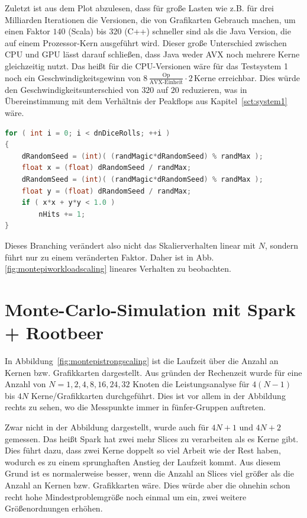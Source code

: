 Zuletzt ist aus dem Plot abzulesen, dass für große Lasten wie z.B. für drei Milliarden Iterationen die Versionen, die von Grafikarten Gebrauch machen, um einen Faktor $140$ (Scala) bis $320$ (C++) schneller sind als die Java Version, die auf einem Prozessor-Kern ausgeführt wird. Dieser große Unterschied zwischen CPU und GPU lässt darauf schließen, dass Java weder AVX noch mehrere Kerne gleichzeitig nutzt. Das heißt für die CPU-Versionen wäre für das Testsystem 1 noch ein Geschwindigkeitsgewinn von $8\,\frac{ \text{Op} }{ \text{AVX-Einheit} } \cdot 2\,\text{Kerne}$ erreichbar. Dies würde den Geschwindigkeitsunterschied von $320$ auf $20$ reduzieren, was in Übereinstimmung mit dem Verhältnis der Peakflops aus Kapitel~\ref{sct:system1} wäre.

\begin{lstlisting}[language=Java,caption={Hauptschleife der Monte-Carlo Pi-Berechnung},label=lst:montemainloop]
for ( int i = 0; i < dnDiceRolls; ++i )
{
    dRandomSeed = (int)( (randMagic*dRandomSeed) % randMax );
    float x = (float) dRandomSeed / randMax;
    dRandomSeed = (int)( (randMagic*dRandomSeed) % randMax );
    float y = (float) dRandomSeed / randMax;
    if ( x*x + y*y < 1.0 )
        nHits += 1;
}
\end{lstlisting}
Dieses Branching verändert also nicht das Skalierverhalten linear mit $N$, sondern führt nur zu einem veränderten Faktor. Daher ist in Abb.\ref{fig:montepiworkloadscaling} lineares Verhalten zu beobachten.



\section{Monte-Carlo-Simulation mit Spark + Rootbeer}


In Abbildung~\ref{fig:montepistrongscaling} ist die Laufzeit über die Anzahl an Kernen bzw. Grafikkarten dargestellt. Aus gründen der Rechenzeit wurde für eine Anzahl von $N=1,2,4,8,16,24,32$ Knoten die Leistungsanalyse für $4(N-1)$ bis $4N$ Kerne/Grafikkarten durchgeführt. Dies ist vor allem in der Abbildung rechts zu sehen, wo die Messpunkte immer in fünfer-Gruppen auftreten.

Zwar nicht in der Abbildung dargestellt, wurde auch für $4N+1$ und $4N+2$ gemessen. Das heißt Spark hat zwei mehr Slices zu verarbeiten als es Kerne gibt. Dies führt dazu, dass zwei Kerne doppelt so viel Arbeit wie der Rest haben, wodurch es zu einem sprunghaften Anstieg der Laufzeit kommt. Aus diesem Grund ist es normalerweise besser, wenn die Anzahl an Slices viel größer als die Anzahl an Kernen bzw. Grafikkarten wäre. Dies würde aber die ohnehin schon recht hohe Mindestproblemgröße noch einmal um ein, zwei weitere Größenordnungen erhöhen.

